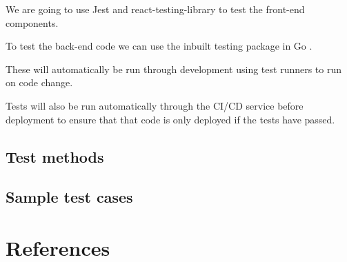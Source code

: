 \documentclass[a4paper,11pt]{article}
\begin{document}
We are going to use Jest \autocite{jest:11} and react-testing-library
\autocite{rtl:12} to test the front-end components.

To test the back-end code we can use the inbuilt testing package in Go
\autocite{go:13}.

These will automatically be run through development using test runners to run on
code change.

Tests will also be run automatically through the CI/CD service before deployment
to ensure that that code is only deployed if the tests have passed.

\subsection{Test methods}









\subsection{Sample test cases}




\pagebreak

\section{References}

\printbibliography{}






\end{document}
